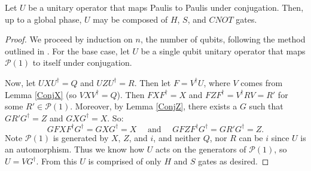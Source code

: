 \documentclass[12pt]{dalthesis}
\begin{document}
\begin{theorem}
\label{HSCNOT}
Let $U$ be a unitary operator that maps Paulis to Paulis under conjugation. Then, up to a global phase, $U$ may be composed of $H$, $S$, and $CNOT$ gates.
\end{theorem}
\begin{proof}
We proceed by induction on $n$, the number of qubits, following the method outlined in \cite{nielsen00}.
For the base case, let $U$ be a single qubit unitary operator that maps $\mathcal{P}(1)$ to itself under conjugation. 

Now, let $UXU^\dag = Q$ and $UZU^\dag = R$. Then let $F = V^\dag U$, where $V$ comes from Lemma \ref{ConjX} (so $VXV^\dag = Q$). Then $FXF^\dag = X$ and $FZF^\dag = V^\dag R V = R'$ for some $R' \in \mathcal{P}(1)$. Moreover, by Lemma \ref{ConjZ}, there exists a $G$ such that $GR'G^\dag = Z$ and $GXG^\dag = X$. So:
\[ 
G FXF^\dag G^\dag = G XG^\dag = X  \quad \mbox{ and } \quad
G FZF^\dag G^\dag = G R' G^\dag = Z.
\]
Note $\mathcal{P}(1)$ is generated by $X$, $Z$, and $i$, and neither $Q$, nor $R$ can be $i$ since $U$ is an automorphism. Thus we know how $U$ acts on the generators of $\mathcal{P}(1)$, so $U = VG^\dag$. From this $U$ is comprised of only $H$ and $S$ gates as desired.


\end{proof}
\end{document}
